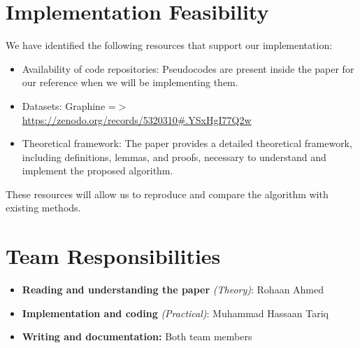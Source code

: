 \documentclass{article}
\begin{document}
\section{Implementation Feasibility}
We have identified the following resources that support our implementation:
\begin{itemize}
    \item Availability of code repositories: Pseudocodes are present inside the paper for our reference when we will be implementing them.
    \item Datasets: Graphine =\(>\) \href{https://zenodo.org/records/5320310#.YSxHgI77Q2w}{https://zenodo.org/records/5320310\#.YSxHgI77Q2w}
    \item Theoretical framework: The paper provides a detailed theoretical framework, including definitions, lemmas, and proofs, necessary to understand and implement the proposed algorithm.
\end{itemize}
These resources will allow us to reproduce and compare the algorithm with existing methods.

\section{Team Responsibilities}
\begin{itemize}
    \item \textbf{Reading and understanding the paper} \textit{(Theory)}: Rohaan Ahmed
    \item \textbf{Implementation and coding} \textit{(Practical)}: Muhammad Hassaan Tariq
    \item \textbf{Writing and documentation:} Both team members
\end{itemize}
\end{document}
